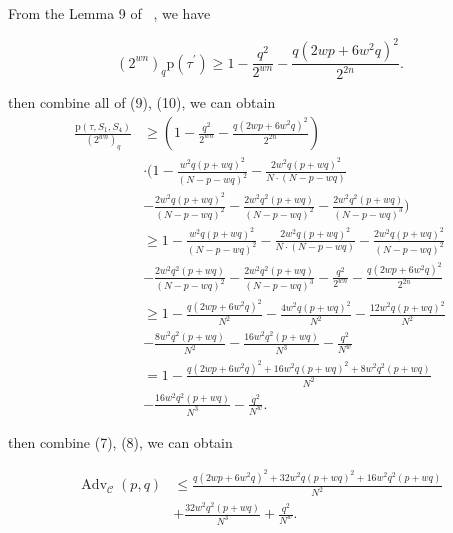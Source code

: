 From the Lemma 9 of ~\cite{cogliati2018wide}, we have

$$
\left(2^{w n}\right)_{q} \mathrm{p}\left(\tau^{\prime}\right) \geq 1-\frac{q^{2}}{2^{w n}}-\frac{q\left(2 w p+6 w^{2} q\right)^{2}}{2^{2 n}}.
$$

\noindent then combine all of (9), (10), we can obtain
$$
\begin{aligned}
\frac{\mathrm{p}\left(\tau, S_{1}, S_{4}\right)}{\left(2^{w n}\right)_{q}} &\geq (1-\frac{q^{2}}{2^{w n}}-\frac{q\left(2 w p+6 w^{2} q\right)^{2}}{2^{2 n}})\\
&\cdot (1- \frac{w^{2} q (p+w q)^{2}}{(N-p-w q)^{2}} -\frac{2 w^{2} q (p+w q)^{2}}{N \cdot (N-p-w q)}\\
&- \frac{2 w^{2} q (p+w q)^{2}}{(N-p- wq)^2} - \frac{2 w^{2} q^{2} (p+w q)}{(N-p- wq)^2} - \frac{2 w^{2} q^{2} (p+w q)}{(N-p- wq)^3})\\
&\geq 1- \frac{w^{2} q (p+w q)^{2}}{(N-p-w q)^{2}} -\frac{2 w^{2} q (p+w q)^{2}}{N \cdot (N-p-w q)}- \frac{2 w^{2} q (p+w q)^{2}}{(N-p- wq)^2} \\
&- \frac{2 w^{2} q^{2} (p+w q)}{(N-p- wq)^2} - \frac{2 w^{2} q^{2} (p+w q)}{(N-p- wq)^3} -\frac{q^{2}}{2^{w n}}-\frac{q\left(2 w p+6 w^{2} q\right)^{2}}{2^{2 n}}\\
&\geq 1- \frac{q(2wp+6w^{2}q)^2}{N^2} - \frac{4w^2q(p+wq)^2}{N^2} - \frac{12 w^2q(p+wq)^2}{N^2}\\
&- \frac{8w^2q^2(p+wq)}{N^2} - \frac{16w^2q^2(p+wq)}{N^3} - \frac{q^2}{N^w}\\
&=1-\frac{q(2wp+6w^{2}q)^2 + 16w^2q(p+ wq)^2 + 8w^2q^2(p+wq)}{N^2}\\
&- \frac{16w^2q^2(p+wq)}{N^3} - \frac{q^2}{N^w}.
\end{aligned}
$$

\noindent then combine (7), (8), we can obtain

$$
\begin{aligned}
\operatorname{Adv}_{\mathcal{C}}\left(p, q\right) &\leq \frac{q(2wp+6w^{2}q)^2 + 32w^2q(p+ wq)^2 + 16w^2q^2(p+wq)}{N^2}\\
&+\frac{32w^2q^2(p+wq)}{N^3} + \frac{q^2}{N^w}.
\end{aligned}
$$




